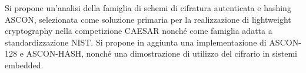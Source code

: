 \noindent
Si propone un'analisi della famiglia di schemi di cifratura autenticata e hashing ASCON, selezionata come soluzione primaria per la realizzazione di lightweight cryptography nella competizione CAESAR nonché come famiglia adatta a standardizzazione NIST. Si propone in aggiunta una implementazione di ASCON-128 e ASCON-HASH, nonché una dimostrazione di utilizzo del cifrario in sistemi embedded.  